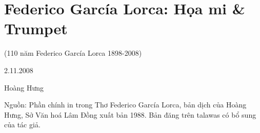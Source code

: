 \documentclass[../main.tex]{subfiles}
\begin{document}
\chapter{Federico García Lorca: Họa mi & Trumpet}

\begin{subtitle}

(110 năm Federico García Lorca 1898-2008)

\end{subtitle}

\begin{metadata}

\begin{flushright}2.11.2008\end{flushright}

Hoàng Hưng

Nguồn: Phần chính in trong Thơ Federico García Lorca, bản dịch của Hoàng Hưng, Sở Văn hoá Lâm Đồng xuất bản 1988. Bản đăng trên talawas có bổ sung của tác giả.

\end{metadata}
\end{document}
